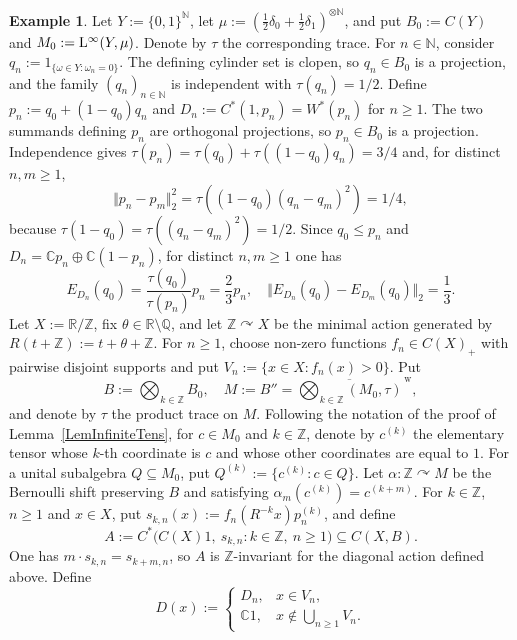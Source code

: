 \documentclass[12pt]{amsart} %
\theoremstyle{plain}
\theoremstyle{definition}
\newtheorem{example}[theorem]{Example}
\newcommand{\N}{\mathbb{N}}
\newcommand{\LL}{{\rm L}}
\begin{document}
\begin{example}
\label{ex:discontinuous-fiber-map}
\noindent Let $Y:=\{0,1\}^{\N}$, let
$\mu:=(\frac12\delta_0+\frac12\delta_1)^{\otimes\N}$, and put
$B_0:=C(Y)$ and $M_0:=\LL^\infty(Y,\mu)$. Denote by $\tau$ the
corresponding trace. For $n\in\N$, consider
$q_n:=1_{\{\omega\in Y:\omega_n=0\}}$. The defining cylinder set is
clopen, so $q_n\in B_0$ is a projection, and the family $(q_n)_{n\in\N}$
is independent with $\tau(q_n)=1/2$. Define
$p_n:=q_0+(1-q_0)q_n$ and
$D_n:=C^*(1,p_n)=W^*(p_n)$ for $n\geq 1$. The two summands defining $p_n$ are orthogonal
projections, so $p_n\in B_0$ is a projection. Independence gives
$\tau(p_n)=\tau(q_0)+\tau((1-q_0)q_n)=3/4$ and, for distinct
$n,m\geq1$,
$$\Vert p_n-p_m\Vert_2^2=\tau((1-q_0)(q_n-q_m)^2)=1/4,$$
because
$\tau(1-q_0)=\tau((q_n-q_m)^2)=1/2$. Since
$q_0\leq p_n$ and
$D_n=\mathbb Cp_n\oplus\mathbb C(1-p_n)$, for distinct
$n,m\geq1$ one has
\begin{equation}\label{eq:continuous-field-separated-fibers}
E_{D_n}(q_0)
=\frac{\tau(q_0)}{\tau(p_n)}p_n
=\frac23p_n,
\quad
\Vert E_{D_n}(q_0)-E_{D_m}(q_0)\Vert_2
=\frac13.
\end{equation}
\medskip
\noindent Let $X:=\mathbb R/\mathbb Z$, fix
$\theta\in\mathbb R\setminus\mathbb Q$, and let $\mathbb Z\curvearrowright X$
be the minimal action generated by
$R(t+\mathbb Z):=t+\theta+\mathbb Z$. For
$n\geq 1$, choose non-zero functions $f_n\in C(X)_+$ with
pairwise disjoint supports and put $V_n:=\{x\in X:f_n(x)>0\}$.
Put
$$
B:=\bigotimes_{k\in\mathbb Z}B_0,
\quad
M:=B''=\overline{\bigotimes_{k\in\mathbb Z}(M_0,\tau)}^{\,\mathrm w},
$$
and denote by $\tau$ the product trace on $M$. Following the notation
of the proof of Lemma~\ref{LemInfiniteTens}, for $c\in M_0$ and
$k\in\mathbb Z$, denote by $c^{(k)}$ the elementary tensor whose
$k$-th coordinate is $c$ and whose other coordinates are equal to $1$.
For a unital subalgebra $Q\subseteq M_0$, put
$Q^{(k)}:=\{c^{(k)}:c\in Q\}$. Let
$\alpha:\mathbb Z\curvearrowright M$ be the Bernoulli shift preserving
$B$ and satisfying $\alpha_m(c^{(k)})=c^{(k+m)}$. For $k\in\mathbb Z$,
$n\geq 1$ and $x\in X$, put
$s_{k,n}(x):=f_n(R^{-k}x)p_n^{(k)}$, and define
$$
A:=C^*\bigl(C(X)1,\ s_{k,n}:k\in\mathbb Z,\
n\geq1\bigr)
\subseteq C(X,B).
$$
One has $m\cdot s_{k,n}=s_{k+m,n}$, so $A$ is
$\mathbb Z$-invariant for the diagonal action defined above.
\medskip
\noindent Define
$$
D(x):=
\begin{cases}
D_n,&x\in V_n,\\
\mathbb C1,&x\notin\displaystyle\bigcup_{n\geq1}V_n.

\end{cases}$$
\end{example}
\end{document}
